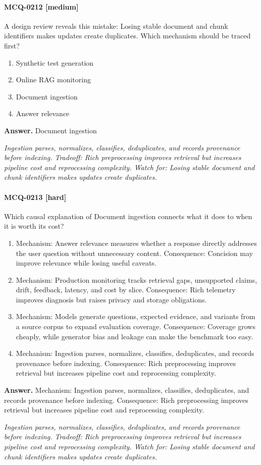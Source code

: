 \paragraph{MCQ-0212 [medium]} A design review reveals this mistake: Losing stable document and chunk identifiers makes updates create duplicates. Which mechanism should be traced first?
\begin{enumerate}[label=\Alph*.]
\item Synthetic test generation
\item Online RAG monitoring
\item Document ingestion
\item Answer relevance
\end{enumerate}
\noindent\textbf{Answer.} Document ingestion
\par\textit{Ingestion parses, normalizes, classifies, deduplicates, and records provenance before indexing. Tradeoff: Rich preprocessing improves retrieval but increases pipeline cost and reprocessing complexity. Watch for: Losing stable document and chunk identifiers makes updates create duplicates.}
\paragraph{MCQ-0213 [hard]} Which causal explanation of Document ingestion connects what it does to when it is worth its cost?
\begin{enumerate}[label=\Alph*.]
\item Mechanism: Answer relevance measures whether a response directly addresses the user question without unnecessary content. Consequence: Concision may improve relevance while losing useful caveats.
\item Mechanism: Production monitoring tracks retrieval gaps, unsupported claims, drift, feedback, latency, and cost by slice. Consequence: Rich telemetry improves diagnosis but raises privacy and storage obligations.
\item Mechanism: Models generate questions, expected evidence, and variants from a source corpus to expand evaluation coverage. Consequence: Coverage grows cheaply, while generator bias and leakage can make the benchmark too easy.
\item Mechanism: Ingestion parses, normalizes, classifies, deduplicates, and records provenance before indexing. Consequence: Rich preprocessing improves retrieval but increases pipeline cost and reprocessing complexity.
\end{enumerate}
\noindent\textbf{Answer.} Mechanism: Ingestion parses, normalizes, classifies, deduplicates, and records provenance before indexing. Consequence: Rich preprocessing improves retrieval but increases pipeline cost and reprocessing complexity.
\par\textit{Ingestion parses, normalizes, classifies, deduplicates, and records provenance before indexing. Tradeoff: Rich preprocessing improves retrieval but increases pipeline cost and reprocessing complexity. Watch for: Losing stable document and chunk identifiers makes updates create duplicates.}
